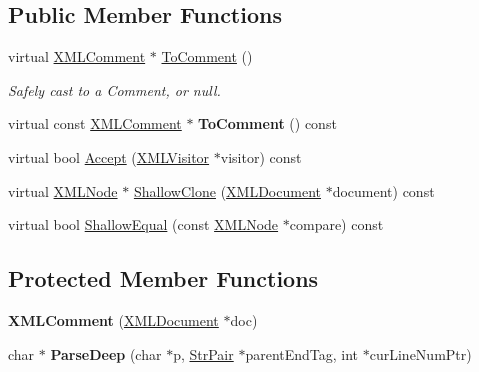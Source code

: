\subsection*{Public Member Functions}
\begin{DoxyCompactItemize}
\item 
\mbox{\label{classCPlantBox_1_1tinyxml2_1_1XMLComment_ae1a67908225f4438ce640de830a8271d}} 
virtual \hyperlink{classCPlantBox_1_1tinyxml2_1_1XMLComment}{X\+M\+L\+Comment} $\ast$ \hyperlink{classCPlantBox_1_1tinyxml2_1_1XMLComment_ae1a67908225f4438ce640de830a8271d}{To\+Comment} ()
\begin{DoxyCompactList}\small\item\em Safely cast to a Comment, or null. \end{DoxyCompactList}\item 
\mbox{\label{classCPlantBox_1_1tinyxml2_1_1XMLComment_ac350d4060f38d68a314ad473cb0348a6}} 
virtual const \hyperlink{classCPlantBox_1_1tinyxml2_1_1XMLComment}{X\+M\+L\+Comment} $\ast$ {\bfseries To\+Comment} () const
\item 
virtual bool \hyperlink{classCPlantBox_1_1tinyxml2_1_1XMLComment_a139f01ec7e0efdd01914e8d2cfd74791}{Accept} (\hyperlink{classCPlantBox_1_1tinyxml2_1_1XMLVisitor}{X\+M\+L\+Visitor} $\ast$visitor) const
\item 
virtual \hyperlink{classCPlantBox_1_1tinyxml2_1_1XMLNode}{X\+M\+L\+Node} $\ast$ \hyperlink{classCPlantBox_1_1tinyxml2_1_1XMLComment_a08324700df05eaef00eec535ef5e02e3}{Shallow\+Clone} (\hyperlink{classCPlantBox_1_1tinyxml2_1_1XMLDocument}{X\+M\+L\+Document} $\ast$document) const
\item 
virtual bool \hyperlink{classCPlantBox_1_1tinyxml2_1_1XMLComment_a8c25248f7f3f3616dba5652b4c239747}{Shallow\+Equal} (const \hyperlink{classCPlantBox_1_1tinyxml2_1_1XMLNode}{X\+M\+L\+Node} $\ast$compare) const
\end{DoxyCompactItemize}
\subsection*{Protected Member Functions}
\begin{DoxyCompactItemize}
\item 
\mbox{\label{classCPlantBox_1_1tinyxml2_1_1XMLComment_ada5a2e72ee8486888c7d4338ce9c6e56}} 
{\bfseries X\+M\+L\+Comment} (\hyperlink{classCPlantBox_1_1tinyxml2_1_1XMLDocument}{X\+M\+L\+Document} $\ast$doc)
\item 
\mbox{\label{classCPlantBox_1_1tinyxml2_1_1XMLComment_a7ffbc365ab71eb5e45ae44b06020c53e}} 
char $\ast$ {\bfseries Parse\+Deep} (char $\ast$p, \hyperlink{classCPlantBox_1_1tinyxml2_1_1StrPair}{Str\+Pair} $\ast$parent\+End\+Tag, int $\ast$cur\+Line\+Num\+Ptr)
\end{DoxyCompactItemize}
